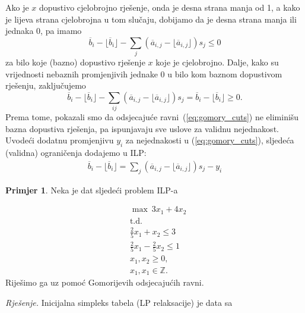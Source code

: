 \documentclass[a4paper, utf8, 11pt, colorlinks]{book}
\theoremstyle{definition}
\newtheorem{primjer}{Primjer}[chapter]
\begin{document}
Ako je $x$ dopustivo cjelobrojno rješenje, onda je desna strana manja od 1, a kako je lijeva strana cjelobrojna u tom slučaju, dobijamo da je desna strana manja ili jednaka 0, pa imamo
\begin{equation}\label{eq:gomory_cuts}
    \overline{b}_i - \lfloor \overline{b}_i  \rfloor    - \sum_{j} (\overline{a}_{i,j} - \lfloor \overline{a}_{i,j} \rfloor) s_j \leq 0
\end{equation}
za bilo koje (bazno) dopustivo rješenje $x$ koje je cjelobrojno. Dalje, kako su vrijednosti nebaznih promjenjivih jednake 0 u bilo kom baznom dopustivom rješenju, zaključujemo
$$ \overline{b}_i - \lfloor \overline{b}_i  \rfloor    - \sum_{ij} (\overline{a}_{i,j} - \lfloor \overline{a}_{i,j} \rfloor) s_j = \overline{b}_i - \lfloor \overline{b}_i \rfloor  \geq 0.$$
Prema tome, pokazali smo da odsjecajuće ravni~(\ref{eq:gomory_cuts}) ne eliminišu bazna dopustiva rješenja, pa ispunjavaju sve uslove za validnu nejednakost. Uvodeći dodatnu promjenjivu $y_i$ za nejednakosti u (\ref{eq:gomory_cuts}), sljedeća (validna) ograničenja dodajemo u ILP:
\begin{align}\label{gomory_cplex}
       \overline{b}_i - \lfloor \overline{b}_i \rfloor=   \sum_{j} (\overline{a}_{i,j} - \lfloor \overline{a}_{i,j} \rfloor)s_j - y_i 
\end{align}

\begin{primjer} Neka je dat sljedeći problem ILP-a
	\end{primjer}
\begin{align*}
    &\max\ 3 x_1 + 4 x_2 \\
    & \mbox{t.d. }  \\
    & \displaystyle\frac{2}{5}x_1 + x_2 \leq 3 \\
    & \displaystyle\frac{2}{5}x_1 - \frac{2}{5}x_2 \leq 1 \\
    &x_1, x_2 \geq 0, \\
    &  x_1, x_1 \in \mathbb{Z}.
\end{align*}
Riješimo ga uz pomoć Gomorijevih odsjecajućih ravni. 

\emph{Rješenje.}
Inicijalna simpleks tabela (LP relaksacije) je data sa 
\end{document}
